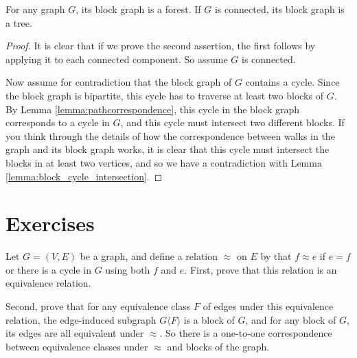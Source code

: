 \documentclass[nobib]{tufte-handout}
\begin{document}
\begin{lemma}
  For any graph $G$, its block graph is a forest. If $G$ is connected, its block graph is a tree.

  \begin{proof}
    It is clear that if we prove the second assertion, the first follows by applying it to each connected component. So assume $G$ is connected.

    Now assume for contradiction that the block graph of $G$ contains a cycle. Since the block graph is bipartite, this cycle has to traverse at least two blocks of $G$. By Lemma \ref{lemma:pathcorrespondence}, this cycle in the block graph corresponds to a cycle in $G$, and this cycle must intersect two different blocks. If you think through the details of how the correspondence between walks in the graph and its block graph works, it is clear that this cycle must intersect the blocks in at least two vertices, and so we have a contradiction with Lemma \ref{lemma:block_cycle_intersection}.
  \end{proof}
\end{lemma}

\section{Exercises}

\begin{xca}
  Let $G = (V,E)$ be a graph, and define a relation $\approx$ on $E$ by that $f \approx e$ if $e = f$ or there is a cycle in $G$ using both $f$ and $e$. First, prove that this relation is an equivalence relation.

  Second, prove that for any equivalence class $F$ of edges under this equivalence relation, the edge-induced subgraph $G\langle F\rangle$ is a block of $G$, and for any block of $G$, its edges are all equivalent under $\approx$. So there is a one-to-one correspondence between equivalence classes under $\approx$ and blocks of the graph.
\end{xca}

%
%
\end{document}
